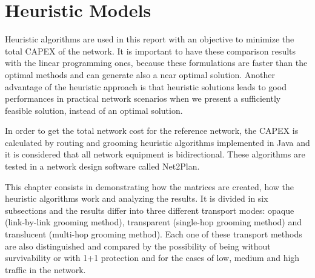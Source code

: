 \chapter{Heuristic Models}

Heuristic algorithms are used in this report with an objective to minimize the total CAPEX of the network. It is important to have these comparison results with the linear programming ones, because these formulations are faster than the optimal methods and can generate also a near optimal solution. Another advantage of the heuristic approach is that heuristic solutions leads to good performances in practical network scenarios when we present a sufficiently feasible solution, instead of an optimal solution.

In order to get the total network cost for the reference network, the CAPEX is calculated by routing and grooming heuristic algorithms implemented in Java and it is considered that all network equipment is bidirectional. These algorithms are tested in a network design software called Net2Plan.

This chapter consists in demonstrating how the matrices are created, how the heuristic algorithms work and analyzing the results. It is divided in six subsections and the results differ into three different transport modes: opaque (link-by-link grooming method), transparent (single-hop grooming method) and translucent (multi-hop grooming method). Each one of these transport methods are also distinguished and compared by the possibility of being without survivability or with 1+1 protection and for the cases of low, medium and high traffic in the network.








